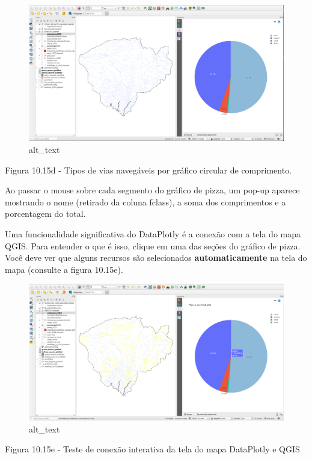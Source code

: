 \documentclass[
  portuguese,
]{krantz}
\begin{document}
\begin{figure}
\centering
\includegraphics{media/modulo10/fig1015_d.png}
\caption{alt\_text}
\end{figure}

Figura 10.15d - Tipos de vias navegáveis \hspace{0pt}\hspace{0pt}por gráfico circular de comprimento.

Ao passar o mouse sobre cada segmento do gráfico de pizza, um pop-up aparece mostrando o nome (retirado da coluna fclass), a soma dos comprimentos e a porcentagem do total.

Uma funcionalidade significativa do DataPlotly é a conexão com a tela do mapa QGIS. Para entender o que é isso, clique em uma das seções do gráfico de pizza. Você deve ver que alguns recursos são selecionados \textbf{automaticamente} na tela do mapa (consulte a figura 10.15e).

\begin{figure}
\centering
\includegraphics{media/modulo10/fig1015_e.png}
\caption{alt\_text}
\end{figure}

Figura 10.15e - Teste de conexão interativa da tela do mapa DataPlotly e QGIS
\end{document}
